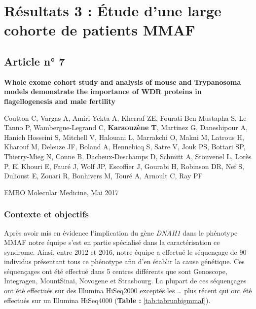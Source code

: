 \documentclass[12pt,twoside]{reedthesis}
\theoremstyle{definition}
\theoremstyle{definition}
\theoremstyle{remark}
\begin{document}
  \newpage  
  
  \section{Résultats 3 : Étude d'une large cohorte de patients
  MMAF}\label{resultats-3-etude-dune-large-cohorte-de-patients-mmaf}
  
  \subsection{Article n° 7}\label{article-n-7}
  
  \textbf{Whole exome cohort study and analysis of mouse and Trypanosoma
  models demonstrate the importance of WDR proteins in flagellogenesis and
  male fertility}
  
  Coutton C, Vargas A, Amiri-Yekta A, Kherraf ZE, Fourati Ben Mustapha S,
  Le Tanno P, Wambergue-Legrand C, \textbf{Karaouzène T}, Martinez G,
  Daneshipour A, Hanieh Hosseini S, Mitchell V, Halouani L, Marrakchi O,
  Makni M, Latrous H, Kharouf M, Deleuze JF, Boland A, Hennebicq S, Satre
  V, Jouk PS, Bottari SP, Thierry-Mieg N, Conne B, Dacheux-Deschamps D,
  Schmitt A, Stouvenel L, Lorès P, El Khouri E, Fauré J, Wolf JP,
  Escoffier J, Gourabi H, Robinson DR, Nef S, Dulioust E, Zouari R,
  Bonhivers M, Touré A, Arnoult C, Ray PF
  
  EMBO Molecular Medicine, Mai 2017
  
  \newpage
  
  \subsubsection{Contexte et objectifs}\label{contexte-et-objectifs-4}
  
  Après avoir mis en évidence l'implication du gène \emph{DNAH1} dans le
  phénotype MMAF notre équipe s'est en partie spécialisé dans la
  caractérisation ce syndrome. Ainsi, entre 2012 et 2016, notre équipe a
  effectué le séquençage de 90 individus présentant tous ce phénotype afin
  d'en établir la cause génétique. Ces séquençages ont été effectué dans 5
  centres différents que sont Genoscope, Integragen, MountSinai, Novogene
  et Strasbourg. La plupart de ces séquençages ont été effectués sur des
  Illumina HiSeq2000 exceptés les \ldots{} plus récent qui ont été
  effectués sur un Illumina HiSeq4000 (\textbf{Table :
  }\ref{tab:tabrunbigmmaf}).
  
\end{document}
